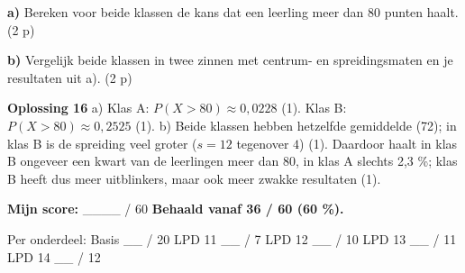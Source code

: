 \textbf{a)} Bereken voor beide klassen de kans dat een leerling meer dan 80 punten haalt. (2 p) \lijn

\textbf{b)} Vergelijk beide klassen in twee zinnen met centrum- en spreidingsmaten en je resultaten uit a). (2 p) \lijn

\begin{oplossing}
\textbf{Oplossing 16} \quad a) Klas A: $P(X>80)\approx 0{,}0228$ (1). Klas B: $P(X>80)\approx 0{,}2525$ (1). b) Beide klassen hebben hetzelfde gemiddelde (72); in klas B is de spreiding veel groter ($s=12$ tegenover $4$) (1). Daardoor haalt in klas B ongeveer een kwart van de leerlingen meer dan 80, in klas A slechts 2,3 \%; klas B heeft dus meer uitblinkers, maar ook meer zwakke resultaten (1).
\end{oplossing}

\begin{doel}
\textbf{Mijn score:} \_\_\_\_ / 60 \quad \textbf{Behaald vanaf 36 / 60 (60 \%).}

Per onderdeel: Basis \_\_ / 20 \quad LPD 11 \_\_ / 7 \quad LPD 12 \_\_ / 10 \quad LPD 13 \_\_ / 11 \quad LPD 14 \_\_ / 12
\end{doel}

